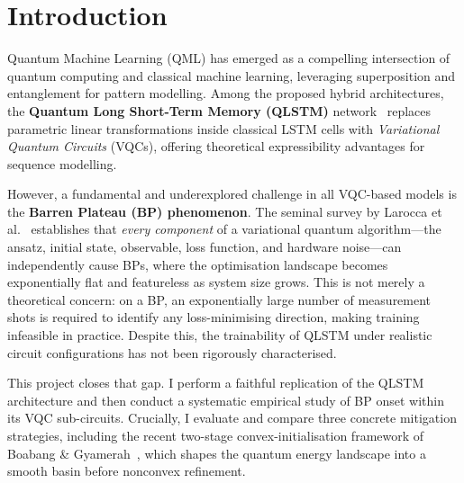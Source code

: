 \documentclass[10pt,twocolumn]{article}
\begin{document}


\section{Introduction}

Quantum Machine Learning (QML) has emerged as a compelling intersection of quantum computing and classical machine learning, leveraging superposition and entanglement for pattern modelling. Among the proposed hybrid architectures, the \textbf{Quantum Long Short-Term Memory (QLSTM)} network~\cite{chen2020qlstm} replaces parametric linear transformations inside classical LSTM cells with \emph{Variational Quantum Circuits} (VQCs), offering theoretical expressibility advantages for sequence modelling.

However, a fundamental and underexplored challenge in all VQC-based models is the \textbf{Barren Plateau (BP) phenomenon}. The seminal survey by Larocca et al.~\cite{larocca2024review} establishes that \emph{every component} of a variational quantum algorithm---the ansatz, initial state, observable, loss function, and hardware noise---can independently cause BPs, where the optimisation landscape becomes exponentially flat and featureless as system size grows. This is not merely a theoretical concern: on a BP, an exponentially large number of measurement shots is required to identify any loss-minimising direction, making training infeasible in practice. Despite this, the trainability of QLSTM under realistic circuit configurations has not been rigorously characterised.

This project closes that gap. I perform a faithful replication of the QLSTM architecture and then conduct a systematic empirical study of BP onset within its VQC sub-circuits. Crucially, I evaluate and compare three concrete mitigation strategies, including the recent two-stage convex-initialisation framework of Boabang \& Gyamerah~\cite{boabang2026twostage}, which shapes the quantum energy landscape into a smooth basin before nonconvex refinement.
\end{document}
